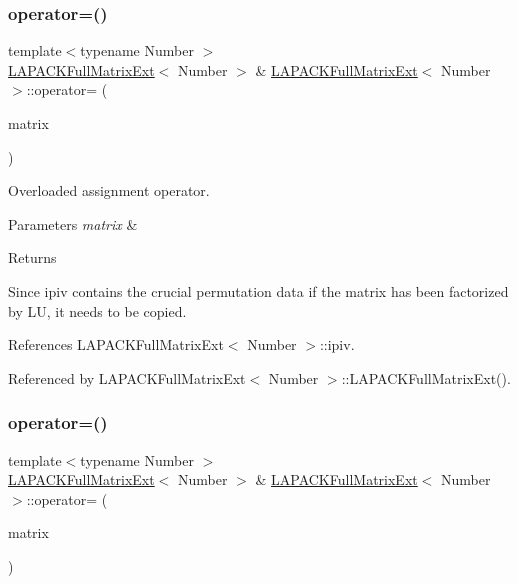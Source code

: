 \subsubsection{\texorpdfstring{operator=()}{operator=()}\hspace{0.1cm}{\footnotesize\ttfamily [1/2]}}
{\footnotesize\ttfamily template$<$typename Number $>$ \\
\hyperlink{classLAPACKFullMatrixExt}{L\+A\+P\+A\+C\+K\+Full\+Matrix\+Ext}$<$ Number $>$ \& \hyperlink{classLAPACKFullMatrixExt}{L\+A\+P\+A\+C\+K\+Full\+Matrix\+Ext}$<$ Number $>$\+::operator= (\begin{DoxyParamCaption}\item[{const \hyperlink{classLAPACKFullMatrixExt}{L\+A\+P\+A\+C\+K\+Full\+Matrix\+Ext}$<$ Number $>$ \&}]{matrix }\end{DoxyParamCaption})}

Overloaded assignment operator. 
\begin{DoxyParams}{Parameters}
{\em matrix} & \\
\hline
\end{DoxyParams}
\begin{DoxyReturn}{Returns}

\end{DoxyReturn}
Since {\ttfamily ipiv} contains the crucial permutation data if the matrix has been factorized by LU, it needs to be copied.

References L\+A\+P\+A\+C\+K\+Full\+Matrix\+Ext$<$ Number $>$\+::ipiv.



Referenced by L\+A\+P\+A\+C\+K\+Full\+Matrix\+Ext$<$ Number $>$\+::\+L\+A\+P\+A\+C\+K\+Full\+Matrix\+Ext().

\mbox{\label{classLAPACKFullMatrixExt_ae277e753101db17ebf5bbd43dd04ab27}} 
\subsubsection{\texorpdfstring{operator=()}{operator=()}\hspace{0.1cm}{\footnotesize\ttfamily [2/2]}}
{\footnotesize\ttfamily template$<$typename Number $>$ \\
\hyperlink{classLAPACKFullMatrixExt}{L\+A\+P\+A\+C\+K\+Full\+Matrix\+Ext}$<$ Number $>$ \& \hyperlink{classLAPACKFullMatrixExt}{L\+A\+P\+A\+C\+K\+Full\+Matrix\+Ext}$<$ Number $>$\+::operator= (\begin{DoxyParamCaption}\item[{const L\+A\+P\+A\+C\+K\+Full\+Matrix$<$ Number $>$ \&}]{matrix }\end{DoxyParamCaption})}

